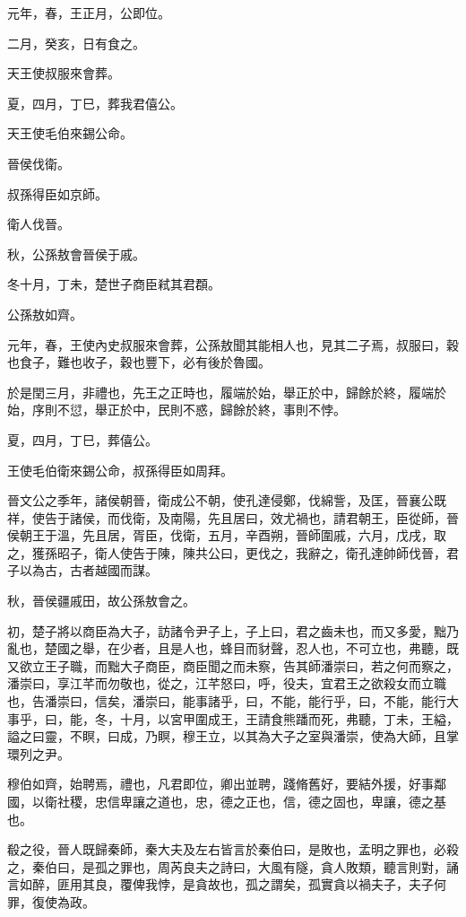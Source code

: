 
\begin{pinyinscope}
元年，春，王正月，公即位。

二月，癸亥，日有食之。

天王使叔服來會葬。

夏，四月，丁巳，葬我君僖公。

天王使毛伯來錫公命。

晉侯伐衛。

叔孫得臣如京師。

衛人伐晉。

秋，公孫敖會晉侯于戚。

冬十月，丁未，楚世子商臣弒其君頵。

公孫敖如齊。

元年，春，王使內史叔服來會葬，公孫敖聞其能相人也，見其二子焉，叔服曰，穀也食子，難也收子，穀也豐下，必有後於魯國。

於是閏三月，非禮也，先王之正時也，履端於始，舉正於中，歸餘於終，履端於始，序則不愆，舉正於中，民則不惑，歸餘於終，事則不悖。

夏，四月，丁巳，葬僖公。

王使毛伯衛來錫公命，叔孫得臣如周拜。

晉文公之季年，諸侯朝晉，衛成公不朝，使孔達侵鄭，伐綿訾，及匡，晉襄公既祥，使告于諸侯，而伐衛，及南陽，先且居曰，效尤禍也，請君朝王，臣從師，晉侯朝王于溫，先且居，胥臣，伐衛，五月，辛酉朔，晉師圍戚，六月，戊戌，取之，獲孫昭子，衛人使告于陳，陳共公曰，更伐之，我辭之，衛孔達帥師伐晉，君子以為古，古者越國而謀。

秋，晉侯疆戚田，故公孫敖會之。

初，楚子將以商臣為大子，訪諸令尹子上，子上曰，君之齒未也，而又多愛，黜乃亂也，楚國之舉，在少者，且是人也，蜂目而豺聲，忍人也，不可立也，弗聽，既又欲立王子職，而黜大子商臣，商臣聞之而未察，告其師潘崇曰，若之何而察之，潘崇曰，享江芊而勿敬也，從之，江芊怒曰，呼，役夫，宜君王之欲殺女而立職也，告潘崇曰，信矣，潘崇曰，能事諸乎，曰，不能，能行乎，曰，不能，能行大事乎，曰，能，冬，十月，以宮甲圍成王，王請食熊蹯而死，弗聽，丁未，王縊，謚之曰靈，不瞑，曰成，乃瞑，穆王立，以其為大子之室與潘崇，使為大師，且掌環列之尹。

穆伯如齊，始聘焉，禮也，凡君即位，卿出並聘，踐脩舊好，要結外援，好事鄰國，以衛社稷，忠信卑讓之道也，忠，德之正也，信，德之固也，卑讓，德之基也。

殽之役，晉人既歸秦師，秦大夫及左右皆言於秦伯曰，是敗也，孟明之罪也，必殺之，秦伯曰，是孤之罪也，周芮良夫之詩曰，大風有隧，貪人敗類，聽言則對，誦言如醉，匪用其良，覆俾我悖，是貪故也，孤之謂矣，孤實貪以禍夫子，夫子何罪，復使為政。


\end{pinyinscope}
